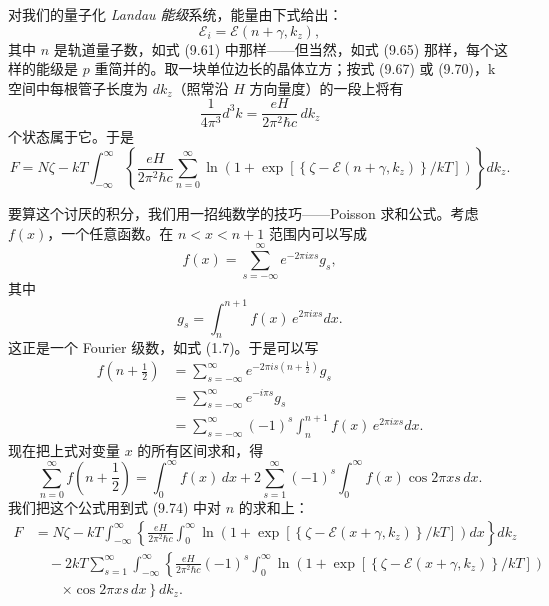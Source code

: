 对我们的量子化 \emph{Landau 能级}系统，能量由下式给出：
\begin{equation*}
\mathcal{E}_{i}=\mathcal{E}(n+\gamma,k_{z}),
\tag{9.72}
\end{equation*}
其中 $n$ 是轨道量子数，如式 (9.61) 中那样——但当然，如式 (9.65) 那样，每个这样的能级是 $p$ 重简并的。取一块单位边长的晶体立方；按式 (9.67) 或 (9.70)，k 空间中每根管子长度为 $dk_{z}$（照常沿 $H$ 方向量度）的一段上将有
\begin{equation*}
\frac{1}{4\pi^{3}}d^{3}k=\frac{eH}{2\pi^{2}\hbar c}\,dk_{z}
\tag{9.73}
\end{equation*}
个状态属于它。于是
\begin{equation*}
F=N\zeta-kT\int_{-\infty}^{\infty}\left\{\frac{eH}{2\pi^{2}\hbar c}\sum_{n=0}^{\infty}\ln\left(1+\exp\left[\left\{\zeta-\mathcal{E}(n+\gamma,k_{z})\right\}/kT\right]\right)\right\}dk_{z}.
\tag{9.74}
\end{equation*}

要算这个讨厌的积分，我们用一招纯数学的技巧——Poisson 求和公式。考虑 $f(x)$，一个任意函数。在 $n<x<n+1$ 范围内可以写成
\begin{equation*}
f(x)=\sum_{s=-\infty}^{\infty}e^{-2\pi ixs}g_{s},
\tag{9.75}
\end{equation*}
其中
\begin{equation*}
g_{s}=\int_{n}^{n+1}f(x)\,e^{2\pi ixs}dx.
\tag{9.76}
\end{equation*}
这正是一个 Fourier 级数，如式 (1.7)。于是可以写
\begin{align*}
f\left(n+\frac{1}{2}\right)&=\sum_{s=-\infty}^{\infty}e^{-2\pi is(n+\frac{1}{2})}g_{s}\\
&=\sum_{s=-\infty}^{\infty}e^{-i\pi s}g_{s}\\
&=\sum_{s=-\infty}^{\infty}(-1)^{s}\int_{n}^{n+1}f(x)\,e^{2\pi ixs}dx.
\tag{9.77}
\end{align*}
现在把上式对变量 $x$ 的所有区间求和，得
\begin{equation*}
\sum_{n=0}^{\infty}f\left(n+\frac{1}{2}\right)=\int_{0}^{\infty}f(x)\,dx+2\sum_{s=1}^{\infty}(-1)^{s}\int_{0}^{\infty}f(x)\cos 2\pi xs\,dx.
\tag{9.78}
\end{equation*}
我们把这个公式用到式 (9.74) 中对 $n$ 的求和上：
\begin{align*}
F&=N\zeta-kT\int_{-\infty}^{\infty}\left\{\frac{eH}{2\pi^{2}\hbar c}\int_{0}^{\infty}\ln\left(1+\exp\left[\left\{\zeta-\mathcal{E}(x+\gamma,k_{z})\right\}/kT\right]\right)dx\right\}dk_{z}\\
&\quad-2kT\sum_{s=1}^{\infty}\int_{-\infty}^{\infty}\left\{\frac{eH}{2\pi^{2}\hbar c}(-1)^{s}\int_{0}^{\infty}\ln\left(1+\exp\left[\left\{\zeta-\mathcal{E}(x+\gamma,k_{z})\right\}/kT\right]\right)\right.\\
&\qquad\left.\times\cos 2\pi xs\,dx\right\}dk_{z}.
\tag{9.79}
\end{align*}

